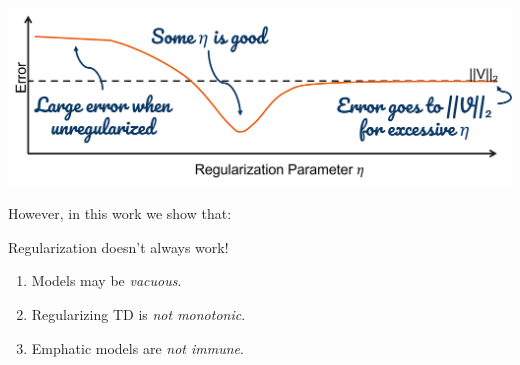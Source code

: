 \begin{center}
    \includegraphics[scale=0.4]{parts/intro/regworks}
\end{center}
However, in this work we show that:
\begin{mybox}
    {\headerfont Regularization doesn't always work!}
    \vspace{.5em}
    {\large
        \begin{enumerate}
            \item Models may be \emph{vacuous}.
            \item Regularizing TD is \emph{not monotonic}.
            \item Emphatic models are \emph{not immune}.
        \end{enumerate}
    }
    \vspace{.5em}
\end{mybox}
